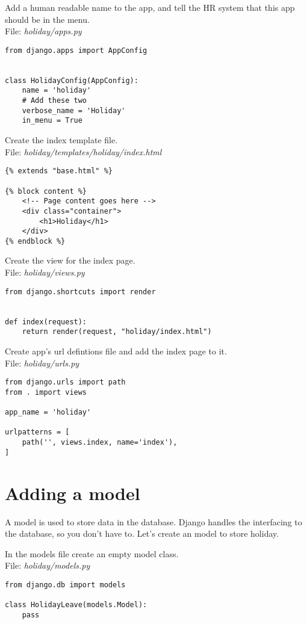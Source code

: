 \documentclass[12pt,a4paper]{article}
\begin{document}
Add a human readable name to the app, and tell the HR system that this app should be in the menu.\\
File: \textit{holiday/apps.py}
\begin{verbatim}
from django.apps import AppConfig


class HolidayConfig(AppConfig):
    name = 'holiday'
    # Add these two
    verbose_name = 'Holiday'
    in_menu = True
\end{verbatim}

Create the index template file.\\
File: \textit{holiday/templates/holiday/index.html}
\begin{verbatim}
{% extends "base.html" %}

{% block content %}
    <!-- Page content goes here -->
    <div class="container">
        <h1>Holiday</h1>
    </div>
{% endblock %}
\end{verbatim}

Create the view for the index page.\\
File: \textit{holiday/views.py}
\begin{verbatim}
from django.shortcuts import render


def index(request):
    return render(request, "holiday/index.html")
\end{verbatim}

Create app's url defintions file and add the index page to it.\\
File: \textit{holiday/urls.py}
\begin{verbatim}
from django.urls import path
from . import views

app_name = 'holiday'

urlpatterns = [
    path('', views.index, name='index'),
]
\end{verbatim}

\section{Adding a model}
A model is used to store data in the database. Django handles the interfacing to the database, so you don't have to. Let's create an model to store holiday.

In the models file create an empty model class.\\
File: \textit{holiday/models.py}
\begin{verbatim}
from django.db import models

class HolidayLeave(models.Model):
	pass
\end{verbatim}
\end{document}
